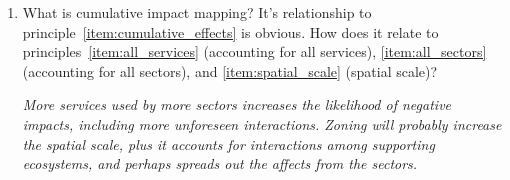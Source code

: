 \documentclass[letterpaper]{tufte-handout}
\begin{document}
\begin{enumerate}
	\item What is cumulative impact mapping? It's relationship to principle~\ref{item:cumulative_effects} is obvious. How does it relate to principles~\ref{item:all_services} (accounting for all services), \ref{item:all_sectors} (accounting for all sectors), and \ref{item:spatial_scale} (spatial scale)?
	
	\textit{More services used by more sectors increases the likelihood of negative impacts, including more unforeseen interactions. Zoning will probably increase the spatial scale, plus it accounts for interactions among supporting ecosystems, and perhaps spreads out the affects from the sectors.}
\end{enumerate}
\end{document}
